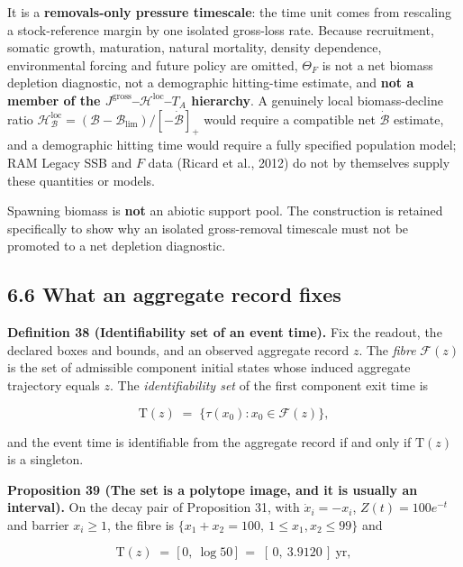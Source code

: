 \documentclass[11pt]{article}
\begin{document}
It is a \textbf{removals-only pressure timescale}: the time unit comes from rescaling a stock-reference margin by one isolated gross-loss rate. Because recruitment, somatic growth, maturation, natural mortality, density dependence, environmental forcing and future policy are omitted, \(\Theta_F\) is not a net biomass depletion diagnostic, not a demographic hitting-time estimate, and \textbf{not a member of the \(J^{\mathrm{gross}}\)--\(\mathcal H^{\mathrm{loc}}\)--\(T_A\) hierarchy}. A genuinely local biomass-decline ratio \(\mathcal H^{\mathrm{loc}}_{\mathcal B}=\allowbreak{}(\mathcal B-\mathcal B_{\mathrm{lim}})/[-\dot{\mathcal B}]_+\allowbreak{}\) would require a compatible net \(\dot{\mathcal B}\) estimate, and a demographic hitting time would require a fully specified population model; RAM Legacy SSB and \(F\) data (Ricard et al., 2012) do not by themselves supply these quantities or models.

Spawning biomass is \textbf{not} an abiotic support pool. The construction is retained specifically to show why an isolated gross-removal timescale must not be promoted to a net depletion diagnostic.

\subsection*{6.6 What an aggregate record fixes}\label{66-what-an-aggregate-record-fixes}

\textbf{Definition 38 (Identifiability set of an event time).} Fix the readout, the declared boxes and bounds, and an observed aggregate record \(z\). The \emph{fibre} \(\mathcal F(z)\) is the set of admissible component initial states whose induced aggregate trajectory equals \(z\). The \emph{identifiability set} of the first component exit time is 

$$\mathrm T(z) \;=\; \bigl\{\tau(x_0) : x_0 \in \mathcal F(z)\bigr\},$$

 and the event time is identifiable from the aggregate record if and only if \(\mathrm T(z)\) is a singleton.

\textbf{Proposition 39 (The set is a polytope image, and it is usually an interval).} On the decay pair of Proposition 31, with \(\dot x_i = -x_i\), \(Z(t) = 100 e^{-t}\) and barrier \(x_i \ge 1\), the fibre is \(\{x_1 +\allowbreak{} x_2 =\allowbreak{} 100,\allowbreak{}\ 1 \le x_1,\allowbreak{} x_2 \le 99\}\) and 

$$\mathrm T(z) \;=\; \bigl[\,0,\ \log 50\,\bigr] \;=\; [\,0,\ 3.9120\,] \ \text{yr},$$
\end{document}

